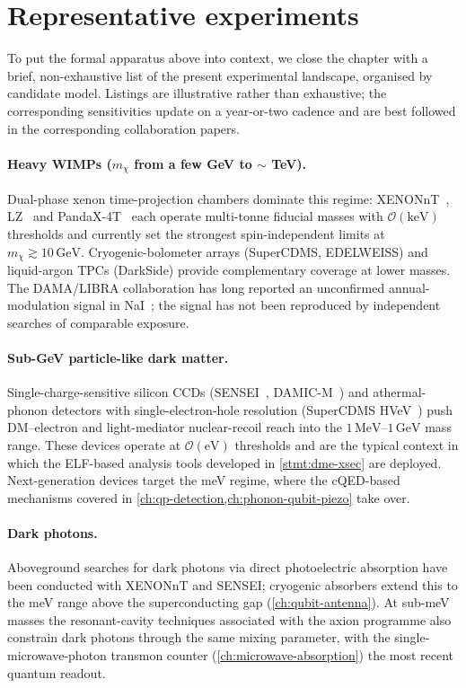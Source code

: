 \section{Representative experiments}
\label{sec:representative-experiments}

To put the formal apparatus above into context, we close the
chapter with a brief, non-exhaustive list of the present
experimental landscape, organised by candidate model. Listings
are illustrative rather than exhaustive; the corresponding
sensitivities update on a year-or-two cadence and are best
followed in the corresponding collaboration papers.

\paragraph{Heavy WIMPs ($m_\chi$ from a few GeV to $\sim$ TeV).}
Dual-phase xenon time-projection chambers dominate this regime:
XENONnT~\cite{xenonnt2023}, LZ~\cite{lz2023} and
PandaX-4T~\cite{pandax2021} each operate multi-tonne fiducial
masses with $\mathcal O(\text{keV})$ thresholds and currently set
the strongest spin-independent limits at $m_\chi\gtrsim 10\,\text{GeV}$.
Cryogenic-bolometer arrays (SuperCDMS, EDELWEISS) and
liquid-argon TPCs (DarkSide) provide complementary coverage at
lower masses. The DAMA/LIBRA collaboration has long reported an
unconfirmed annual-modulation signal in NaI~\cite{dama2018}; the
signal has not been reproduced by independent searches of
comparable exposure.

\paragraph{Sub-GeV particle-like dark matter.}
Single-charge-sensitive silicon CCDs (SENSEI~\cite{sensei2020},
DAMIC-M~\cite{damicm2023}) and athermal-phonon detectors with
single-electron-hole resolution (SuperCDMS HVeV~\cite{supercdms2020})
push DM--electron and light-mediator nuclear-recoil reach into
the $1\,\text{MeV}$--$1\,\text{GeV}$ mass range. These devices
operate at $\mathcal O(\text{eV})$ thresholds and are the typical
context in which the ELF-based analysis tools developed in
\cref{stmt:dme-xsec} are deployed. Next-generation devices target
the meV regime, where the cQED-based mechanisms covered in
\cref{ch:qp-detection,ch:phonon-qubit-piezo} take over.

\paragraph{Dark photons.}
Aboveground searches for dark photons via direct photoelectric
absorption have been conducted with XENONnT and SENSEI; cryogenic
absorbers extend this to the meV range above the superconducting
gap (\cref{ch:qubit-antenna}). At sub-meV masses the resonant-cavity
techniques associated with the axion programme also constrain
dark photons through the same mixing parameter, with the
single-microwave-photon transmon counter
(\cref{ch:microwave-absorption}) the most recent quantum readout.

